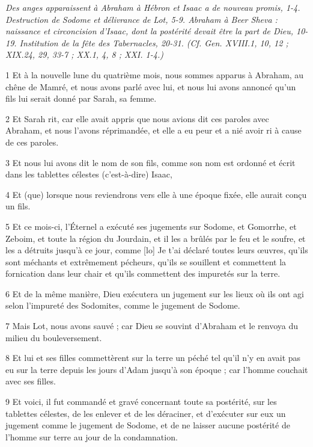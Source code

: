 
\par \textit{Des anges apparaissent à Abraham à Hébron et Isaac a de nouveau promis, 1-4. Destruction de Sodome et délivrance de Lot, 5-9. Abraham à Beer Sheva : naissance et circoncision d'Isaac, dont la postérité devait être la part de Dieu, 10-19. Institution de la fête des Tabernacles, 20-31. (Cf. Gen. XVIII.1, 10, 12 ; XIX.24, 29, 33-7 ; XX.1, 4, 8 ; XXI. 1-4.)}

\par 1 Et à la nouvelle lune du quatrième mois, nous sommes apparus à Abraham, au chêne de Mamré, et nous avons parlé avec lui, et nous lui avons annoncé qu'un fils lui serait donné par Sarah, sa femme.
\par 2 Et Sarah rit, car elle avait appris que nous avions dit ces paroles avec Abraham, et nous l'avons réprimandée, et elle a eu peur et a nié avoir ri à cause de ces paroles.
\par 3 Et nous lui avons dit le nom de son fils, comme son nom est ordonné et écrit dans les tablettes célestes (c'est-à-dire) Isaac,
\par 4 Et (que) lorsque nous reviendrons vers elle à une époque fixée, elle aurait conçu un fils.
\par 5 Et ce mois-ci, l'Éternel a exécuté ses jugements sur Sodome, et Gomorrhe, et Zeboim, et toute la région du Jourdain, et il les a brûlés par le feu et le soufre, et les a détruits jusqu'à ce jour, comme [lo] Je t'ai déclaré toutes leurs œuvres, qu'ils sont méchants et extrêmement pécheurs, qu'ils se souillent et commettent la fornication dans leur chair et qu'ils commettent des impuretés sur la terre.
\par 6 Et de la même manière, Dieu exécutera un jugement sur les lieux où ils ont agi selon l'impureté des Sodomites, comme le jugement de Sodome.
\par 7 Mais Lot, nous avons sauvé ; car Dieu se souvint d'Abraham et le renvoya du milieu du bouleversement.
\par 8 Et lui et ses filles commettèrent sur la terre un péché tel qu'il n'y en avait pas eu sur la terre depuis les jours d'Adam jusqu'à son époque ; car l'homme couchait avec ses filles.
\par 9 Et voici, il fut commandé et gravé concernant toute sa postérité, sur les tablettes célestes, de les enlever et de les déraciner, et d'exécuter sur eux un jugement comme le jugement de Sodome, et de ne laisser aucune postérité de l'homme sur terre au jour de la condamnation.
